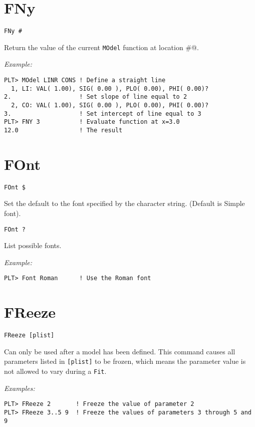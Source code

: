 \section*{FNy}
\begin{verbatim}
FNy #
\end{verbatim}
   Return the value of the current {\tt MOdel} function at location \verb@#@.

\medskip\noindent
{\em Example:}
\begin{verbatim}
PLT> MOdel LINR CONS ! Define a straight line
  1, LI: VAL( 1.00), SIG( 0.00 ), PLO( 0.00), PHI( 0.00)?
2.                   ! Set slope of line equal to 2
  2, CO: VAL( 1.00), SIG( 0.00 ), PLO( 0.00), PHI( 0.00)?
3.                   ! Set intercept of line equal to 3
PLT> FNY 3           ! Evaluate function at x=3.0
12.0                 ! The result
\end{verbatim}

\section*{FOnt}
\begin{verbatim}
FOnt $
\end{verbatim}
   Set the default to the font specified by the character string.  (Default
is Simple font).

\medskip
\begin{verbatim}
FOnt ?
\end{verbatim}
   List possible fonts.

\medskip\noindent
{\em Example:}
\begin{verbatim}
PLT> Font Roman      ! Use the Roman font
\end{verbatim}

\section*{FReeze}
\begin{verbatim}
FReeze [plist]
\end{verbatim}
   Can only be used after a model has been defined.  This command
causes all parameters listed in {\tt [plist]} to be frozen, which means
the parameter value is not allowed to vary during a {\tt Fit}.

\medskip\noindent
{\em Examples:}
\begin{verbatim}
PLT> FReeze 2       ! Freeze the value of parameter 2
PLT> FReeze 3..5 9  ! Freeze the values of parameters 3 through 5 and 9
\end{verbatim}

